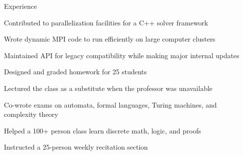 \documentclass{cv}
\begin{document}

\begin{cvsection}{Experience}
  {
    \item Contributed to parallelization facilities for a C++ solver framework
    \item Wrote dynamic MPI code to run efficiently on large computer clusters
    \item Maintained API for legacy compatibility while making major internal updates
  }
  {
    \item Designed and graded homework for 25 students
    \item Lectured the class as a substitute when the professor was unavailable
    \item Co-wrote exams on automata, formal languages, Turing machines, and complexity theory
  }
  {
    \item Helped a 100+ person class learn discrete math, logic, and proofs
    \item Instructed a 25-person weekly recitation section
  }
\end{cvsection}
\end{document}
